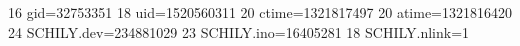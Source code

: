 16 gid=32753351
18 uid=1520560311
20 ctime=1321817497
20 atime=1321816420
24 SCHILY.dev=234881029
23 SCHILY.ino=16405281
18 SCHILY.nlink=1
